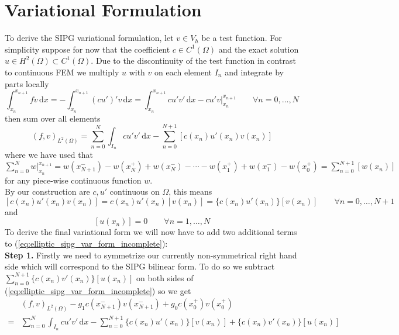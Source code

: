 \section{Variational Formulation}
To derive the SIPG variational formulation, let $v \in V_h$ be a test
function. For simplicity suppose for now that the coefficient $c \in C^1(\Omega)$ and
the exact solution $u \in H^2(\Omega) \subset C^1(\Omega)$. 
Due to the discontinuity of the test function in contrast to 
continuous FEM we multiply $u$ with $v$ on each element $I_n$
and integrate by parts locally
\begin{equation*}
    \int_{x_n}^{x_{n+1}} fv\, \text{d}x = -\int_{x_n}^{x_{n+1}} (cu')'v\, \text{d}x 
    = \int_{x_n}^{x_{n+1}} cu'v'\, \text{d}x 
    -  cu'v\Big|_{x_n}^{x_{n+1}} \qquad \forall n=0,\ldots,N
\end{equation*}
then sum over all elements
\begin{equation}
    \label{eq:elliptic_sipg_var_form_incomplete}
    (f,v)_{L^2(\Omega)} = \sum_{n=0}^N \int_{I_n} cu'v'\, \text{d}x 
    -\sum_{n=0}^{N+1} [c(x_n)u'(x_n)v(x_n)]
\end{equation}
where we have used that $\sum_{n=0}^N  w \Big|_{x_n}^{x_{n+1}} = w(x_{N+1}^-) - 
w(x_{N}^+) + w(x_{N}^-) - \cdots - w(x_1^+) + w(x_1^-) - w(x_0^+) = \sum_{n=0}^{N+1} [w(x_n)]$ for any piece-wise continuous function $w$.
\\
By our construction are $c, u'$ continuous on $\Omega$, this means 
\begin{equation}
    \label{eq:id_1_cu_jump_zero}
        [c(x_n)u'(x_n)v(x_n)] = c(x_n)u'(x_n)[v(x_n)] = \{c(x_n)u'(x_n)\}[v(x_n)] \qquad \forall n=0,\ldots,N+1
\end{equation}
and 
\begin{equation}
    \label{eq:id_2_u_jump_zero}
    [u(x_n)] = 0 \qquad \forall n=1,\ldots,N
\end{equation}
To derive the final variational form we will now have to add two additional terms
to (\ref{eq:elliptic_sipg_var_form_incomplete}): \\
\textbf{Step 1.} Firstly we need to symmetrize our currently non-symmetrical right hand side
which will correspond to the SIPG bilinear form. To do so
we subtract $\sum_{n=0}^{N+1} \{c(x_n)v'(x_n)\}[u(x_n)]$ on both sides of
(\ref{eq:elliptic_sipg_var_form_incomplete}) so we get
\begin{align*}
    &(f,v)_{L^2(\Omega)}-g_1c(x_{N+1}^-)v(x_{N+1}^-) + g_0c(x_0^+)v(x_0^+) \\
    = &\sum_{n=0}^N \int_{I_n} cu'v'\, \text{d}x 
    -\sum_{n=0}^{N+1} \{c(x_n)u'(x_n)\}[v(x_n)] + \{c(x_n)v'(x_n)\}[u(x_n)]
\end{align*}
